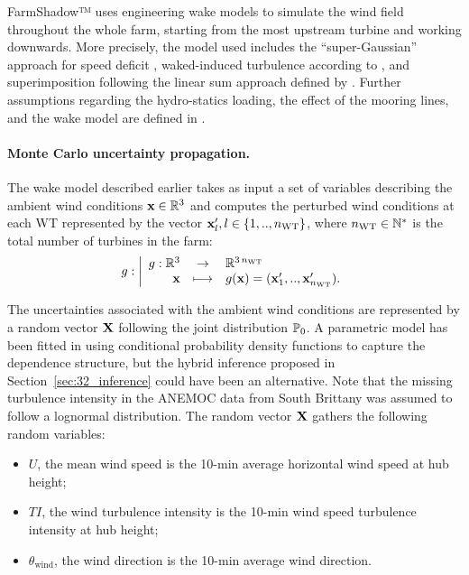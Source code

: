 FarmShadow™ uses engineering wake models to simulate the wind field throughout the whole farm, starting from the most upstream turbine and working downwards. 
More precisely, the model used includes the ``super-Gaussian'' approach for speed deficit \citep{blondel_2020}, waked-induced turbulence according to \citet{quian_2018}, and superimposition following the linear sum approach defined by \citet{zong_2020}.    
Further assumptions regarding the hydro-statics loading, the effect of the mooring lines, and the wake model are defined in \citet{lovera_fekhari_2023}.


\paragraph{Monte Carlo uncertainty propagation.}

The wake model described earlier takes as input a set of variables describing the ambient wind conditions $\bx \in \mathbb{R}^3$ and computes the perturbed wind conditions at each WT represented by the vector $\bx _l', l \in \left\{1,..,n_{\mathrm{WT}}\right\}$, where $n_{\mathrm{WT}} \in \N^*$ is the total number of turbines in the farm:
\begin{equation}
    g : \bigg|
        \begin{array}{rcl}
            g:\mathbb{R}^3 & \rightarrow & \mathbb{R}^{3 \, n_{\mathrm{WT}}} \\
            \bx &\longmapsto & g(\bx) = (\bx_1',..,\bx_{n_{\mathrm{WT}}}').
        \end{array}
    \end{equation}

The uncertainties associated with the ambient wind conditions are represented by a random vector $\bX$ following the joint distribution $\P_0$. 
A parametric model has been fitted in \cite{vanem_fekhari_2023} using conditional probability density functions to capture the dependence structure, 
but the hybrid inference proposed in Section~\ref{sec:32_inference} could have been an alternative. 
Note that the missing turbulence intensity in the ANEMOC data from South Brittany was assumed to follow a lognormal distribution.   
The random vector $\bX$ gathers the following random variables:
\begin{itemize}
    \item $U$, the mean wind speed is the 10-min average horizontal wind speed at hub height;
    \item $TI$, the wind turbulence intensity is the 10-min wind speed turbulence intensity at hub height;
    \item $\theta_{\mathrm{wind}}$, the wind direction is the 10-min average wind direction.
\end{itemize}

